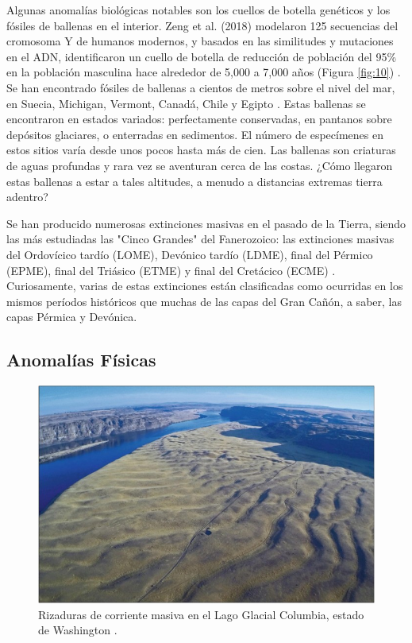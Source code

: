 \documentclass[10pt,twocolumn,letterpaper]{article}
\begin{document}
Algunas anomalías biológicas notables son los cuellos de botella genéticos y los fósiles de ballenas en el interior. Zeng et al. (2018) modelaron 125 secuencias del cromosoma Y de humanos modernos, y basados en las similitudes y mutaciones en el ADN, identificaron un cuello de botella de reducción de población del 95\% en la población masculina hace alrededor de 5,000 a 7,000 años (Figura \ref{fig:10}) \cite{62}. Se han encontrado fósiles de ballenas a cientos de metros sobre el nivel del mar, en Suecia, Michigan, Vermont, Canadá, Chile y Egipto \cite{63,64,65,66}. Estas ballenas se encontraron en estados variados: perfectamente conservadas, en pantanos sobre depósitos glaciares, o enterradas en sedimentos. El número de especímenes en estos sitios varía desde unos pocos hasta más de cien. Las ballenas son criaturas de aguas profundas y rara vez se aventuran cerca de las costas. ¿Cómo llegaron estas ballenas a estar a tales altitudes, a menudo a distancias extremas tierra adentro?

Se han producido numerosas extinciones masivas en el pasado de la Tierra, siendo las más estudiadas las "Cinco Grandes" del Fanerozoico: las extinciones masivas del Ordovícico tardío (LOME), Devónico tardío (LDME), final del Pérmico (EPME), final del Triásico (ETME) y final del Cretácico (ECME) \cite{88,89}. Curiosamente, varias de estas extinciones están clasificadas como ocurridas en los mismos períodos históricos que muchas de las capas del Gran Cañón, a saber, las capas Pérmica y Devónica.

\subsection{Anomalías Físicas}

\begin{figure}[b]
\begin{center}
   \includegraphics[width=1\linewidth]{columbia.jpg}
\end{center}
   \caption{Rizaduras de corriente masiva en el Lago Glacial Columbia, estado de Washington \cite{80}.}
\label{fig:11}
\label{fig:onecol}
\end{figure}
\end{document}
